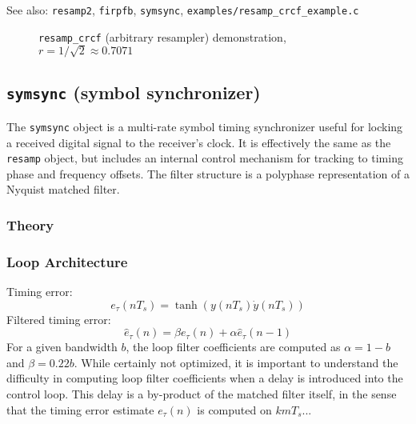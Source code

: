 See also: {\tt resamp2}, {\tt firpfb}, {\tt symsync},
{\tt examples/resamp\_crcf\_example.c}

\begin{figure}
\centering
{}
\caption{{\tt resamp\_crcf} (arbitrary resampler) demonstration,
$r=1/\sqrt{2}\approx0.7071$}
\label{fig:module:filter:resamp_crcf}
\end{figure}

\subsection{{\tt symsync} (symbol synchronizer)}
The {\tt symsync} object is a multi-rate symbol timing synchronizer useful for
locking a received digital signal to the receiver's clock.
It is effectively the same as the {\tt resamp} object, but includes an
internal control mechanism for tracking to timing phase and frequency offsets.
The filter structure is a polyphase representation of a Nyquist matched
filter.

\subsubsection{Theory}

\subsubsection{Loop Architecture}
Timing error:
\[
    e_\tau(nT_s) = \tanh\left( y(nT_s)\dot{y}(nT_s) \right)
\]
Filtered timing error:
\[
    \hat{e}_\tau(n) = \beta e_\tau(n) + \alpha \hat{e}_\tau(n-1)
\]
For a given bandwidth $b$, the loop filter coefficients are computed as
$\alpha = 1-b$ and $\beta = 0.22b$.
While certainly not optimized, it is important to understand the difficulty in
computing loop filter coefficients when a delay is introduced into the control
loop.
This delay is a by-product of the matched filter itself, in the sense that the
timing error estimate $e_\tau(n)$ is computed on $k m T_s$...

